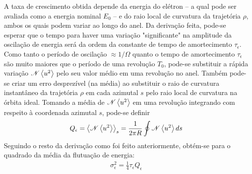 A taxa de crescimento obtida depende da energia do elétron -- a qual pode ser avaliada como a energia nominal $E_0$ -- e do raio local de curvatura da trajetória $\rho$, ambos os quais podem variar ao longo do anel. Da derivação feita, pode-se esperar que o tempo para haver uma variação "significante" na amplitude da oscilação de energia será da ordem da constante de tempo de amortecimento $\tau_\epsilon$. Como tanto o período de oscilação $\approx 1/\Omega$ quanto o tempo de amortecimento $\tau_\epsilon$ são muito maiores que o período de uma revolução $T_0$, pode-se substituir a rápida variação $\mathscr{N}\left< u^2 \right>$ pelo seu valor médio em uma revolução no anel. Também pode-se criar um erro desprezível (na média) ao substituir o raio de curvatura instantâneo da trajetória $\rho$ em cada azimutal $s$ pelo raio local de curvatura na órbita ideal. Tomando a média de $\mathscr{N}\left< u^2 \right>$ em uma revolução integrando com respeito à coordenada azimutal $s$, pode-se definir
\begin{align}
	Q_\epsilon = \left< \mathscr{N}\left< u^2 \right> \right>_s = \frac{1}{2\pi R}\oint\mathscr{N}\left< u^2 \right>ds
\end{align}
Seguindo o resto da derivação como foi feito anteriormente, obtém-se para o quadrado da média da flutuação de energia:
\begin{align}
	\sigma_\epsilon^2 = \frac{1}{4}\tau_\epsilon Q_\epsilon\label{eq:5.37}
\end{align}

